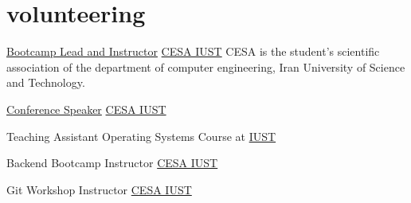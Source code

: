 \documentclass[a4paper]{article}
\begin{document}
\begin{minipage}[t]{0.3\textwidth}
  \section{volunteering}
  {

     \volunteer
     {\href{https://www.linkedin.com/posts/cesa-iust_قراره-با-هم-دنیای-وب-رو-زیر-و-رو-کنیم-activity-7221917118215180288-SRca/?rcm=ACoAACBgw1ABKvTqrlXwvAbFBul6vPHXEMeIFWw}{Bootcamp Lead and Instructor}}
      {\href{https://www.linkedin.com/company/cesa-iust/}{CESA IUST}}
      {CESA is the student's scientific association of the department of computer engineering, Iran University of Science and Technology.}
    
      \vspace*{6pt}

     \volunteer
      {\href{https://www.linkedin.com/posts/sina-shabaniku_techroad-activity-7201269217688436736-C0G2?utm_source=share&utm_medium=member_desktop&rcm=ACoAACBgw1ABKvTqrlXwvAbFBul6vPHXEMeIFWw}{Conference Speaker}}
      {\href{https://www.linkedin.com/company/cesa-iust/}{CESA IUST}}
      {}

    \vspace*{6pt}

    \volunteer
      {Teaching Assistant}
      {Operating Systems Course at \href{https://www.linkedin.com/school/iran-university-of-science-and-technology/}{IUST}}
      {}

    \vspace*{6pt}

    \volunteer
      {Backend Bootcamp Instructor}
      {\href{https://www.linkedin.com/company/cesa-iust/}{CESA IUST}}
      {}

    \vspace*{6pt}

    \volunteer
      {Git Workshop Instructor}
      {\href{https://www.linkedin.com/company/cesa-iust/}{CESA IUST}}
      {}
  }
\end{minipage}
\hspace{20pt}
\end{document}
